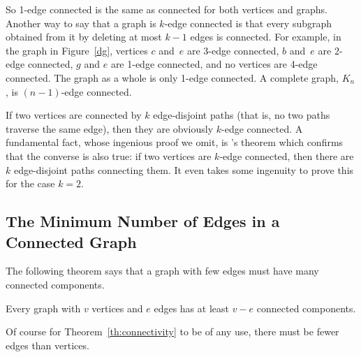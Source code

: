So 1-edge connected is the same as connected for both vertices and
graphs.  Another way to say that a graph is $k$-edge connected is
that every subgraph obtained from it by deleting at most $k-1$ edges
is connected.  For example, in the graph in Figure~\ref{dg},
vertices $c$ and~$e$ are 3-edge connected, $b$ and~$e$ are 2-edge
connected, $g$ and $e$ are 1-edge connected, and no vertices are
4-edge connected.  The graph as a whole is only 1-edge connected.
A complete graph, $K_n$, is $(n-1)$-edge connected.

If two vertices are connected by $k$ edge-disjoint paths (that is, no
two paths traverse the same edge), then they are obviously $k$-edge
connected.  A fundamental fact, whose ingenious proof we omit,
is 's theorem which confirms that the converse is also
true: if two vertices are $k$-edge connected, then there are $k$
edge-disjoint paths connecting them.  It even takes some ingenuity to
prove this for the case $k=2$.

\subsection{The Minimum Number of Edges in a Connected Graph}

The following theorem says that a graph with few edges must have many
connected components.
\begin{theorem}\label{th:connectivity}
Every graph with $v$ vertices and $e$ edges has at least $v - e$ connected
components.
\end{theorem}
Of course for Theorem~\ref{th:connectivity} to be of any use, there must
be fewer edges than vertices.

